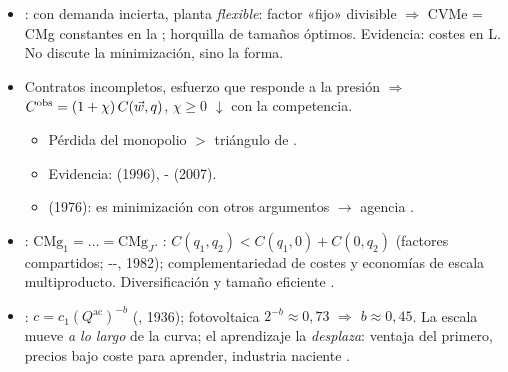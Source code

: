 \documentclass{article}
\begin{document}
\begin{columnas}
\begin{itemize}
\item {}: con demanda incierta, planta \emph{flexible}: factor «fijo» divisible $\Rightarrow$ CVMe = CMg constantes en la ; horquilla de tamaños óptimos. Evidencia: costes en L. No discute la minimización, sino la forma.
\end{itemize}
\begin{itemize}
\item Contratos incompletos, esfuerzo que responde a la presión $\Rightarrow$ $C^{\mathrm{obs}}=(1+\chi)\,C(\vec{w},q)$, $\chi\geq0$ $\downarrow$ con la competencia.
  \begin{itemize}
  \item Pérdida del monopolio $>$ triángulo de .
  \item Evidencia:  (1996), - (2007).
  \item {} (1976): es minimización con otros argumentos $\to$ agencia .
  \end{itemize}
\end{itemize}
\begin{itemize}
\item {}: $\mathrm{CMg}_1=\dots=\mathrm{CMg}_J$. :  $C(q_1,q_2)<C(q_1,0)+C(0,q_2)$ (factores compartidos; --, 1982); complementariedad de costes y economías de escala multiproducto. Diversificación y tamaño eficiente .
\item {}: $c=c_1(Q^{\mathrm{ac}})^{-b}$ (, 1936); fotovoltaica $2^{-b}\approx0{,}73$ $\Rightarrow$ $b\approx0{,}45$. La escala mueve \emph{a lo largo} de la curva; el aprendizaje la \emph{desplaza}: ventaja del primero, precios bajo coste para aprender, industria naciente .
\end{itemize}


\end{columnas}
\end{document}
